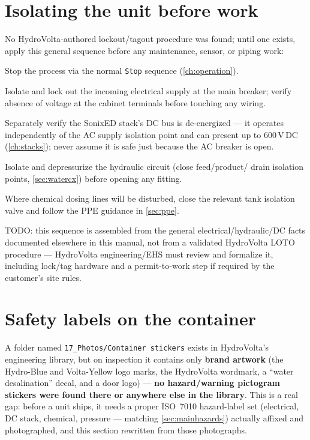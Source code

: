 \documentclass[a4paper,11pt,twoside,openright,numbers=noenddot]{scrreprt}
\newcommand{\plctag}[1]{\texttt{\small #1}}
\newcommand{\sonixed}{SonixED\texttrademark\xspace}
\begin{document}
\section{Isolating the unit before work}
\label{sec:isolation}
No HydroVolta-authored lockout/tagout procedure was found; until one
exists, apply this general sequence before any maintenance, sensor, or
piping work:
\begin{procedure}
\item Stop the process via the normal \plctag{Stop} sequence
  (\cref{ch:operation}).
\item Isolate and lock out the incoming electrical supply at the main
  breaker; verify absence of voltage at the cabinet terminals before
  touching any wiring.
\item Separately verify the \sonixed stack's DC bus is de-energized ---
  it operates independently of the AC supply isolation point and can
  present up to 600\,V\,DC (\cref{ch:stacks}); never assume it is safe
  just because the AC breaker is open.
\item Isolate and depressurize the hydraulic circuit (close feed/product/
  drain isolation points, \cref{sec:watercx}) before opening any fitting.
\item Where chemical dosing lines will be disturbed, close the relevant
  tank isolation valve and follow the PPE guidance in \cref{sec:ppe}.
\end{procedure}
TODO: this sequence is assembled from the general electrical/hydraulic/DC
facts documented elsewhere in this manual, not from a validated
HydroVolta LOTO procedure --- HydroVolta engineering/EHS must review and
formalize it, including lock/tag hardware and a permit-to-work step if
required by the customer's site rules.

\section{Safety labels on the container}
A folder named \texttt{17\_Photos/Container stickers} exists in
HydroVolta's engineering library, but on inspection it contains only
\textbf{brand artwork} (the Hydro-Blue and Volta-Yellow logo marks, the
HydroVolta wordmark, a \enquote{water desalination} decal, and a door
logo) --- \textbf{no hazard/warning pictogram stickers were found there or
anywhere else in the library}. This is a real gap: before a unit ships, it
needs a proper ISO~7010 hazard-label set (electrical, DC stack, chemical,
pressure --- matching \cref{sec:mainhazards}) actually affixed and
photographed, and this section rewritten from those photographs.
\end{document}
